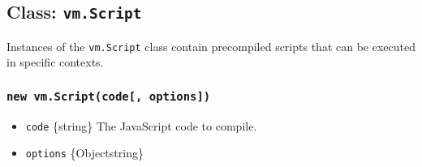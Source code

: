 \subsection{\texorpdfstring{Class:
\texttt{vm.Script}}{Class: vm.Script}}\label{class-vm.script}

Instances of the \texttt{vm.Script} class contain precompiled scripts
that can be executed in specific contexts.

\subsubsection{\texorpdfstring{\texttt{new\ vm.Script(code{[},\ options{]})}}{new vm.Script(code{[}, options{]})}}\label{new-vm.scriptcode-options}

\begin{itemize}
\tightlist
\item
  \texttt{code} \{string\} The JavaScript code to compile.
\item
  \texttt{options} \{Object\textbar string\}


\end{itemize}
